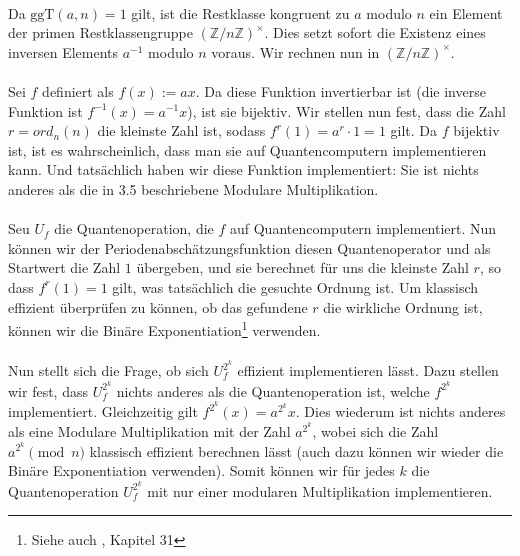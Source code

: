 \paragraph{}
Da $\text{ggT}(a, n) = 1$ gilt, ist die Restklasse kongruent zu $a$ modulo $n$ ein Element der primen Restklassengruppe $(\mathbb {Z}/n\mathbb {Z} )^{\times}$. Dies setzt sofort die Existenz eines inversen Elements $a^{-1}$ modulo $n$ voraus. Wir rechnen nun in $(\mathbb {Z}/n\mathbb {Z})^{\times}$.
\paragraph{}
Sei $f$ definiert als $f(x) := ax$. Da diese Funktion invertierbar ist (die inverse Funktion ist $f^{-1}(x) = a^{-1}x$), ist sie bijektiv. Wir stellen nun fest, dass die Zahl $r = ord_n(n)$ die kleinste Zahl ist, sodass $f^r(1) = a^r\cdot 1 = 1$ gilt. Da $f$ bijektiv ist, ist es wahrscheinlich, dass man sie auf Quantencomputern implementieren kann. Und tatsächlich haben wir diese Funktion implementiert: Sie ist nichts anderes als die in 3.5 beschriebene Modulare Multiplikation.

\paragraph{}
Seu $U_f$ die Quantenoperation, die $f$ auf Quantencomputern implementiert. Nun können wir der Periodenabschätzungsfunktion diesen Quantenoperator und als Startwert die Zahl $1$ übergeben, und sie berechnet für uns die kleinste Zahl $r$, so dass $f^r(1) = 1$ gilt, was tatsächlich die gesuchte Ordnung ist. Um klassisch effizient überprüfen zu können, ob das gefundene $r$ die wirkliche Ordnung ist, können wir die Binäre Exponentiation\footnote{Siehe auch \cite{clrs}, Kapitel 31} verwenden.
\paragraph{}
Nun stellt sich die Frage, ob sich $U_f^{2^k}$ effizient implementieren lässt. Dazu stellen wir fest, dass $U_f^{2^k}$ nichts anderes als die Quantenoperation ist, welche $f^{2^k}$ implementiert. Gleichzeitig gilt $f^{2^k}(x) = a^{2^k}x$. Dies wiederum ist nichts anderes als eine Modulare Multiplikation mit der Zahl $a^{2^k}$, wobei sich die Zahl $a^{2^k} \pmod{n}$ klassisch effizient berechnen lässt (auch dazu können wir wieder die Binäre Exponentiation verwenden). Somit können wir für jedes $k$ die Quantenoperation $U_f^{2^k}$ mit nur einer modularen Multiplikation implementieren.

